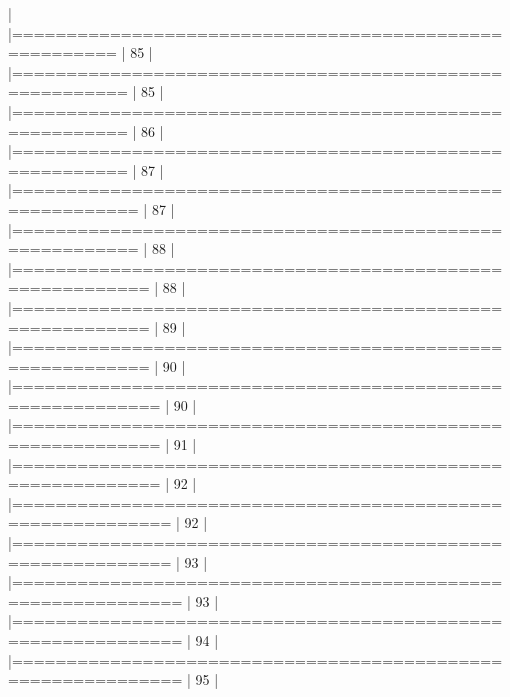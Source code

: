 \documentclass[10pt]{article}
\newenvironment{CodeChunk}{}{}
\begin{document}
\begin{CodeChunk}
\begin{CodeChunk}
\begin{CodeOutput}
  |                                                                       
  |=======================================================          |  85%
  |                                                                       
  |========================================================         |  85%
  |                                                                       
  |========================================================         |  86%
  |                                                                       
  |========================================================         |  87%
  |                                                                       
  |=========================================================        |  87%
  |                                                                       
  |=========================================================        |  88%
  |                                                                       
  |==========================================================       |  88%
  |                                                                       
  |==========================================================       |  89%
  |                                                                       
  |==========================================================       |  90%
  |                                                                       
  |===========================================================      |  90%
  |                                                                       
  |===========================================================      |  91%
  |                                                                       
  |===========================================================      |  92%
  |                                                                       
  |============================================================     |  92%
  |                                                                       
  |============================================================     |  93%
  |                                                                       
  |=============================================================    |  93%
  |                                                                       
  |=============================================================    |  94%
  |                                                                       
  |=============================================================    |  95%
  |                                                                       

\end{CodeOutput}
\end{CodeChunk}
\end{CodeChunk}
\end{document}
